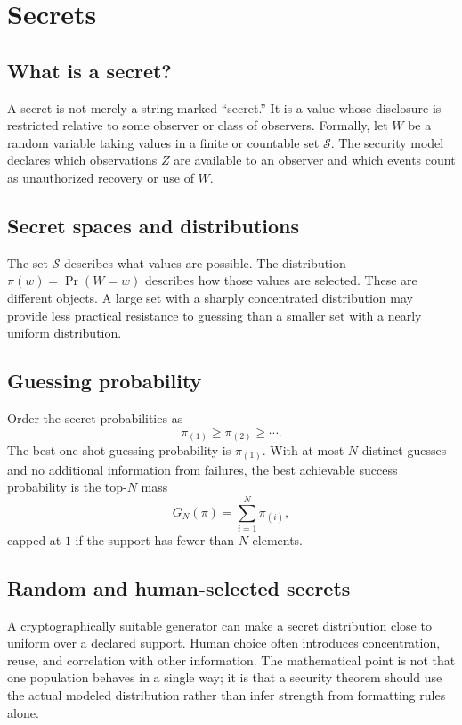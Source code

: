 \documentclass[11pt,oneside]{book}
\theoremstyle{definition}
\theoremstyle{remark}
\newcommand{\Prb}{\operatorname{Pr}}
\begin{document}
\chapter{Secrets}
\label{ch:secrets}
\section{What is a secret?}
A secret is not merely a string marked ``secret.'' It is a value whose disclosure is restricted relative to some observer or class of observers. Formally, let $W$ be a random variable taking values in a finite or countable set $\mathcal S$. The security model declares which observations $Z$ are available to an observer and which events count as unauthorized recovery or use of $W$.

\section{Secret spaces and distributions}
The set $\mathcal S$ describes what values are possible. The distribution $\pi(w)=\Prb(W=w)$ describes how those values are selected. These are different objects. A large set with a sharply concentrated distribution may provide less practical resistance to guessing than a smaller set with a nearly uniform distribution.

\section{Guessing probability}
Order the secret probabilities as
\[
\pi_{(1)}\ge \pi_{(2)}\ge \cdots.
\]
The best one-shot guessing probability is $\pi_{(1)}$. With at most $N$ distinct guesses and no additional information from failures, the best achievable success probability is the top-$N$ mass
\[
G_N(\pi)=\sum_{i=1}^{N}\pi_{(i)},
\]
capped at $1$ if the support has fewer than $N$ elements.

\section{Random and human-selected secrets}
A cryptographically suitable generator can make a secret distribution close to uniform over a declared support. Human choice often introduces concentration, reuse, and correlation with other information. The mathematical point is not that one population behaves in a single way; it is that a security theorem should use the actual modeled distribution rather than infer strength from formatting rules alone.
\end{document}
